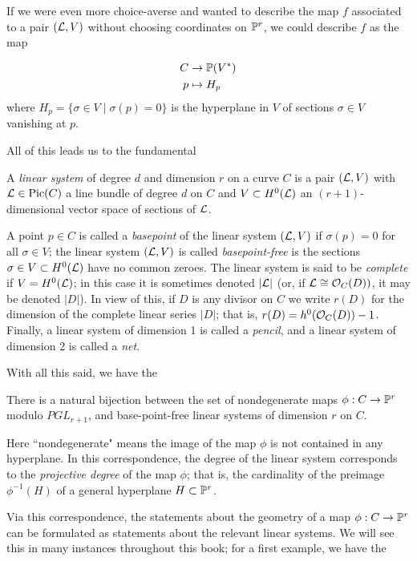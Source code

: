 \documentclass[12pt, leqno]{book}
\def\cL{{\cal L}}
\begin{document}
If we were even more choice-averse and wanted to describe the map $f$ associated to a pair $(\cL, V)$ without choosing coordinates on $\PP^r$, we could describe $f$ as the map

\begin{align*}
C &\to \PP(V^*) \\
p &\mapsto H_p
\end{align*}
where $H_p = \{\sigma \in V \mid \sigma(p) = 0\}$ is the hyperplane in $V$ of sections $\sigma \in V$ vanishing at $p$.

All of this leads us to the fundamental

\begin{definition}
A \emph{linear system} of degree $d$ and dimension $r$ on a curve $C$ is a pair $(\cL, V)$ with $\cL \in \Pic(C)$ a line bundle of degree $d$ on $C$ and $V \subset H^0(\cL)$ an $(r+1)$-dimensional vector space of sections of $\cL$.
\end{definition}

A point $p \in C$ is called a \emph{basepoint} of the linear system $(\cL,V)$ if $\sigma(p)=0$ for all $\sigma \in V$; the linear system $(\cL,V)$ is called \emph{basepoint-free} is the sections $\sigma \in V \subset H^0(\cL)$ have no common zeroes. The linear system is said to be \emph{complete} if $V = H^0(\cL)$; in this case it is sometimes denoted $|\cL|$ (or, if $\cL \cong \cO_C(D))$, it may be denoted $|D|$). In view of this, if $D$ is any divisor on $C$ we write $r(D)$ for the dimension of the complete linear series $|D|$; that is, $r(D) = h^0(\cO_C(D)) - 1$. Finally, a linear system of dimension 1 is called a \emph{pencil}, and a linear system of dimension 2 is called a \emph{net}.

With all this said, we have the 

\begin{proposition}
There is a natural bijection between the set of nondegenerate maps $\phi : C \to \PP^r$ modulo $PGL_{r+1}$, and base-point-free linear systems of dimension $r$ on $C$.
\end{proposition}

Here ``nondegenerate" means the image of the map $\phi$ is not contained in any hyperplane. In this correspondence, the degree of the linear system corresponds to the \emph{projective degree} of the map $\phi$; that is, the cardinality of the preimage $\phi^{-1}(H)$ of a general hyperplane $H \subset \PP^r$.

Via this correspondence, the statements about the geometry of a map $\phi : C \to \PP^r$ can be formulated as statements about the relevant linear systems. We will see this in many instances throughout this book; for a first example, we have the
\end{document}
